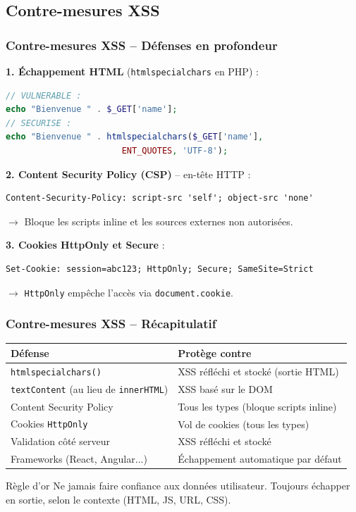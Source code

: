 \documentclass{beamer}
\def\emptyline{\vspace{10pt}}
\begin{document}
\subsection{Contre-mesures XSS}

\begin{frame}[fragile]
\frametitle{Contre-mesures XSS -- Défenses en profondeur}

\textbf{1. Échappement HTML} (\texttt{htmlspecialchars} en PHP) :
\begin{lstlisting}[language=PHP]
// VULNERABLE :
echo "Bienvenue " . $_GET['name'];
// SECURISE :
echo "Bienvenue " . htmlspecialchars($_GET['name'],
                       ENT_QUOTES, 'UTF-8');
\end{lstlisting}

\textbf{2. Content Security Policy (CSP)} -- en-tête HTTP :
\begin{lstlisting}[basicstyle=\ttfamily\scriptsize,frame=single]
Content-Security-Policy: script-src 'self'; object-src 'none'
\end{lstlisting}
$\rightarrow$ Bloque les scripts inline et les sources externes non autorisées.

\emptyline
\textbf{3. Cookies HttpOnly et Secure} :
\begin{lstlisting}[basicstyle=\ttfamily\scriptsize,frame=single]
Set-Cookie: session=abc123; HttpOnly; Secure; SameSite=Strict
\end{lstlisting}
$\rightarrow$ \texttt{HttpOnly} empêche l'accès via \texttt{document.cookie}.
\end{frame}


\begin{frame}
\frametitle{Contre-mesures XSS -- Récapitulatif}

\begin{scriptsize}
\begin{tabular}{|p{3.5cm}|p{5.5cm}|}
\hline
\textbf{Défense} & \textbf{Protège contre} \\
\hline
\texttt{htmlspecialchars()} & XSS réfléchi et stocké (sortie HTML) \\
\hline
\texttt{textContent} (au lieu de \texttt{innerHTML}) & XSS basé sur le DOM \\
\hline
Content Security Policy & Tous les types (bloque scripts inline) \\
\hline
Cookies \texttt{HttpOnly} & Vol de cookies (tous les types) \\
\hline
Validation côté serveur & XSS réfléchi et stocké \\
\hline
Frameworks (React, Angular...) & Échappement automatique par défaut \\
\hline
\end{tabular}
\end{scriptsize}

\emptyline
\begin{block}{Règle d'or}
\alert{Ne jamais faire confiance aux données utilisateur.} Toujours échapper en sortie, selon le contexte (HTML, JS, URL, CSS).
\end{block}
\end{frame}
\end{document}
